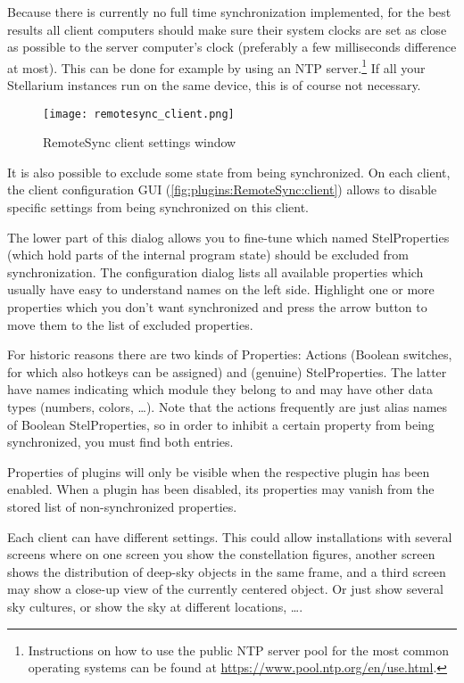 \noindent Because there is currently no full time synchronization implemented, for the best
results all client computers should make sure their system clocks are set as
close as possible to the server computer's clock (preferably a few milliseconds
difference at most). This can be done for example by using an NTP server.\footnote{
Instructions on how to use the public NTP server pool for the most common
operating systems can be found at \url{https://www.pool.ntp.org/en/use.html}.} 
If all your Stellarium instances run on the same device, this is of course not 
necessary.

\begin{figure}[ht]
	\centering\texttt{[image: remotesync\_client.png]}
	\caption{RemoteSync client settings window}
	\label{fig:plugins:RemoteSync:client}
\end{figure}

It is also possible to exclude some state from being synchronized. On each
client, the client configuration GUI (\autoref{fig:plugins:RemoteSync:client}) allows to
disable specific settings from being synchronized on this client. 

The lower part of this dialog allows you to 
fine-tune which named StelProperties (which hold parts of the internal program state) 
should be excluded from synchronization. 
The configuration dialog lists all available properties which usually have easy to understand 
names on the left side. Highlight one or more properties which you don't want synchronized 
and press the arrow button to move them to the list of excluded properties.

For historic reasons there are two kinds of Properties: Actions 
(Boolean switches, for which also hotkeys can be assigned) and (genuine) StelProperties. 
The latter have names indicating which module they belong to and may have other data types (numbers, colors, \ldots). 
Note that the actions frequently are just alias names of Boolean StelProperties, 
so in order to inhibit a certain property from being synchronized, you must find both entries.

Properties of plugins will only be visible when the respective plugin has been enabled. 
When a plugin has been disabled, its properties may vanish from the stored list of non-synchronized properties.

Each client can have different settings. This could allow installations with several screens
where on one screen you show the constellation figures, another screen shows the
distribution of deep-sky objects in the same frame, and a third screen may show
a close-up view of the currently centered object. Or just show several sky cultures, 
or show the sky at different locations, \ldots. 

